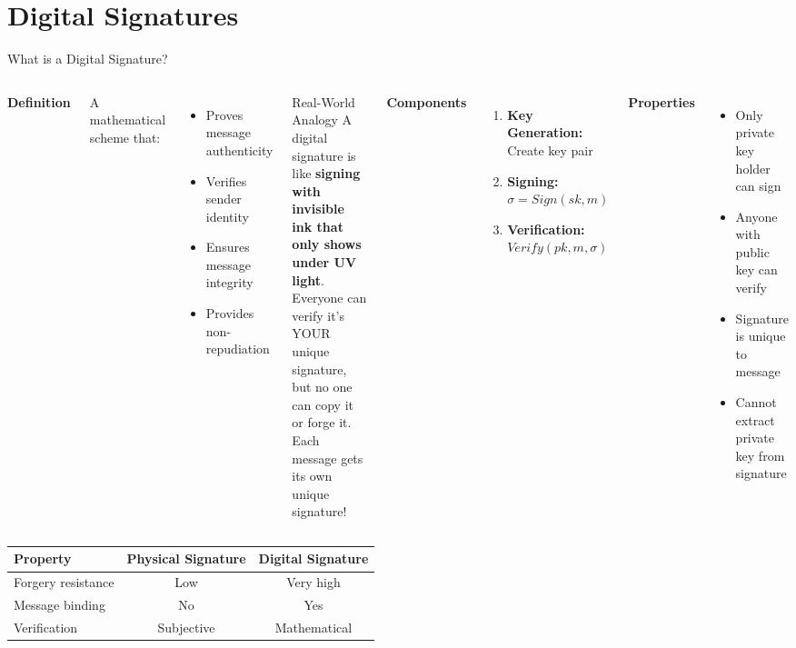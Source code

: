 \documentclass[8pt,aspectratio=169]{beamer}
\begin{document}
\section{Digital Signatures}

\begin{frame}[t]{What is a Digital Signature?}
\begin{columns}[T]
\textbf{Definition}

A mathematical scheme that:
\begin{itemize}
\item Proves message authenticity
\item Verifies sender identity
\item Ensures message integrity
\item Provides non-repudiation
\end{itemize}

\vspace{0.3em}
\begin{block}{Real-World Analogy}
A digital signature is like \textbf{signing with invisible ink that only shows under UV light}. Everyone can verify it's YOUR unique signature, but no one can copy it or forge it. Each message gets its own unique signature!
\end{block}

\textbf{Components}

\begin{enumerate}
\item \textbf{Key Generation:} Create key pair
\item \textbf{Signing:} $\sigma = Sign(sk, m)$
\item \textbf{Verification:} $Verify(pk, m, \sigma)$
\end{enumerate}

\vspace{0.5em}
\textbf{Properties}
\begin{itemize}
\item Only private key holder can sign
\item Anyone with public key can verify
\item Signature is unique to message
\item Cannot extract private key from signature
\end{itemize}
\end{columns}

\vspace{0.5em}
\begin{center}
\begin{tabular}{lcc}
\toprule
\textbf{Property} & \textbf{Physical Signature} & \textbf{Digital Signature} \\
\midrule
Forgery resistance & Low & Very high \\
Message binding & No & Yes \\
Verification & Subjective & Mathematical \\
\bottomrule
\end{tabular}
\end{center}
\end{frame}
\end{document}
